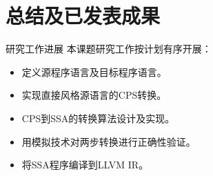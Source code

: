 
\section{总结及已发表成果}

\begin{frame}{研究工作进展}
    本课题研究工作按计划有序开展：
    \begin{itemize}
      \item 定义源程序语言及目标程序语言。
      \item 实现直接风格源语言的CPS转换。
      \item CPS到SSA的转换算法设计及实现。
      \item 用模拟技术对两步转换进行正确性验证。
      \item 将SSA程序编译到LLVM IR。
    \end{itemize}
  \end{frame}


